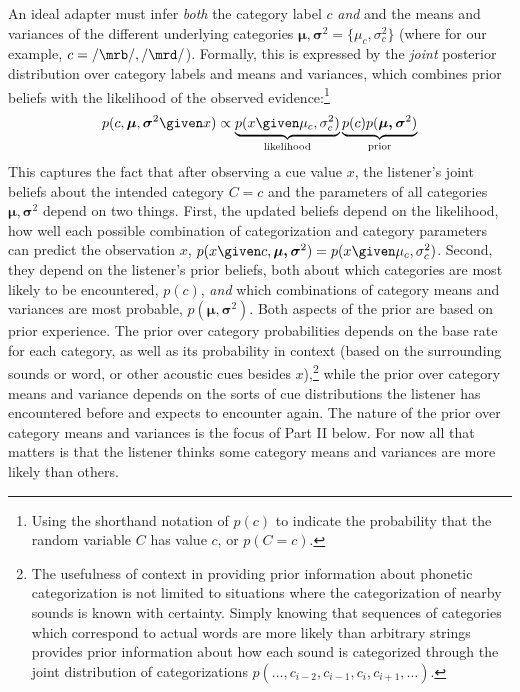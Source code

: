 An ideal adapter must infer \emph{both} the category label $c$  \emph{and} and the means and variances of the different underlying categories $\boldsymbol\mu, \boldsymbol\sigma^2 = \{\mu_c, \sigma^2_c\}$ (where for our example, $c=/\mrb/, /\mrd/$).  Formally, this is expressed by the \emph{joint} posterior distribution over category labels and means and variances, which combines prior beliefs with the likelihood of the observed evidence:\footnote{Using the shorthand notation of $p(c)$ to indicate the probability that the random variable $C$ has value $c$, or $p(C=c)$.}
\begin{equation}
  \label{eq:12}
  p(c, \boldsymbol{\mu}, \boldsymbol{\sigma}^2 \given x) \propto
  \underbrace{p(x \given \mu_c, \sigma^2_c)}_\mathrm{likelihood}
  \underbrace{p(c) p(\boldsymbol{\mu, \sigma}^2)}_\mathrm{prior}
\end{equation}
This captures the fact that after observing a cue value $x$, the listener's joint beliefs about the intended category $C=c$ and the parameters of all categories $\boldsymbol{\mu, \sigma}^2$ depend on two things.  First, the updated beliefs depend on the likelihood, how well each possible combination of categorization and category parameters can predict the observation $x$, $p(x \given c, \boldsymbol{\mu, \sigma}^2) = p(x \given \mu_c, \sigma^2_c)$.  Second, they depend on the listener's prior beliefs, both about which categories are most likely to be encountered, $p(c)$, \emph{and} which combinations of category means and variances are most probable, $p(\boldsymbol{\mu,\sigma}^2)$.  Both aspects of the prior are based on prior experience.  The prior over category probabilities depends on the base rate for each category, as well as its probability in context (based on the surrounding sounds or word, or other acoustic cues besides $x$),\footnote{The usefulness of context in providing prior information about phonetic categorization is not limited to situations where the categorization of nearby sounds is known with certainty.  Simply knowing that sequences of categories which correspond to actual words are more likely than arbitrary strings provides prior information about how each sound is categorized through the joint distribution of categorizations $p(\ldots, c_{i-2}, c_{i-1}, c_i, c_{i+1}, \ldots)$.} while the prior over category means and variance depends on the sorts of cue distributions the listener has encountered before and expects to encounter again.  The nature of the prior over category means and variances is the focus of Part II below.  For now all that matters is that the listener thinks some category means and variances are more likely than others.

